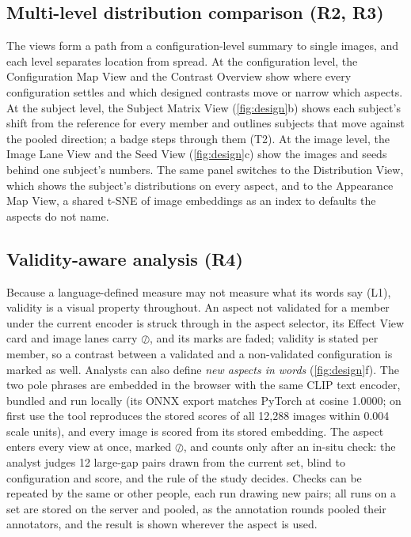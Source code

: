 \documentclass[review]{vgtc}                 %
\begin{document}
\subsection{Multi-level distribution comparison (R2, R3)}
\label{sec:multilevel}
The views form a path from a configuration-level summary to single images, and each level separates location from spread. At the configuration level, the Configuration Map View and the Contrast Overview show where every configuration settles and which designed contrasts move or narrow which aspects. At the subject level, the Subject Matrix View (\cref{fig:design}b) shows each subject's shift from the reference for every member and outlines subjects that move against the pooled direction; a badge steps through them (T2). At the image level, the Image Lane View and the Seed View (\cref{fig:design}c) show the images and seeds behind one subject's numbers. The same panel switches to the Distribution View, which shows the subject's distributions on every aspect, and to the Appearance Map View, a shared t-SNE of image embeddings as an index to defaults the aspects do not name.

\subsection{Validity-aware analysis (R4)}
\label{sec:validity}
Because a language-defined measure may not measure what its words say (L1), validity is a visual property throughout. An aspect not validated for a member under the current encoder is struck through in the aspect selector, its Effect View card and image lanes carry $\oslash$, and its marks are faded; validity is stated per member, so a contrast between a validated and a non-validated configuration is marked as well. Analysts can also define \emph{new aspects in words} (\cref{fig:design}f). The two pole phrases are embedded in the browser with the same CLIP text encoder, bundled and run locally (its ONNX export matches PyTorch at cosine 1.0000; on first use the tool reproduces the stored scores of all 12,288 images within 0.004 scale units), and every image is scored from its stored embedding. The aspect enters every view at once, marked $\oslash$, and counts only after an in-situ check: the analyst judges 12 large-gap pairs drawn from the current set, blind to configuration and score, and the rule of the study decides. Checks can be repeated by the same or other people, each run drawing new pairs; all runs on a set are stored on the server and pooled, as the annotation rounds pooled their annotators, and the result is shown wherever the aspect is used.
\end{document}
